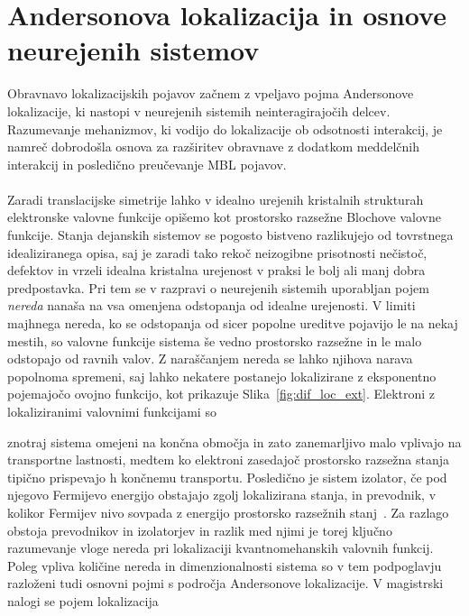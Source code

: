 \section{Andersonova lokalizacija in osnove neurejenih sistemov}
\label{anderson}
Obravnavo lokalizacijskih pojavov začnem z vpeljavo pojma Andersonove lokalizacije, ki nastopi v neurejenih sistemih neinteragirajočih delcev. Razumevanje mehanizmov, ki vodijo do lokalizacije ob odsotnosti interakcij, je namreč dobrodošla osnova za razširitev obravnave z dodatkom meddelčnih interakcij in posledično preučevanje MBL pojavov. \\\\	
Zaradi translacijske simetrije lahko v idealno urejenih kristalnih strukturah elektronske valovne funkcije  opišemo kot prostorsko razsežne Blochove valovne funkcije. Stanja dejanskih sistemov se pogosto bistveno razlikujejo od tovrstnega idealiziranega opisa, saj je zaradi tako rekoč neizogibne prisotnosti nečistoč, defektov in vrzeli idealna kristalna urejenost v praksi le bolj ali manj dobra predpostavka. Pri tem se v razpravi o neurejenih sistemih uporabljan pojem \emph{nereda} nanaša na vsa omenjena odstopanja od idealne urejenosti.  V limiti majhnega nereda, ko se odstopanja od sicer popolne ureditve pojavijo le na nekaj mestih, so valovne funkcije sistema še vedno prostorsko razsežne in le malo odstopajo od ravnih valov. Z naraščanjem nereda se lahko njihova narava popolnoma spremeni, saj lahko nekatere  postanejo lokalizirane z eksponentno pojemajočo ovojno funkcijo, kot prikazuje Slika~\ref{fig:dif_loc_ext}. Elektroni z lokaliziranimi valovnimi funkcijami so\\
\begin{minipage}[t]{0.54\textwidth}
\noindent 
    znotraj sistema omejeni na končna območja in zato zanemarljivo malo vplivajo na transportne lastnosti, medtem ko elektroni zasedajoč prostorsko razsežna stanja tipično prispevajo h končnemu transportu. Posledično je sistem izolator, če pod njegovo Fermijevo energijo obstajajo zgolj lokalizirana stanja, in prevodnik, v kolikor Fermijev nivo sovpada z energijo prostorsko razsežnih stanj~\cite{kramer1993localization}. Za razlago obstoja prevodnikov in izolatorjev in razlik med njimi je torej ključno razumevanje vloge nereda pri lokalizaciji kvantnomehanskih valovnih funkcij. Poleg vpliva količine nereda in dimenzionalnosti sistema so v tem podpoglavju razloženi tudi osnovni pojmi s področja Andersonove lokalizacije. V magistrski nalogi se pojem lokalizacija  
\end{minipage}\hfill

